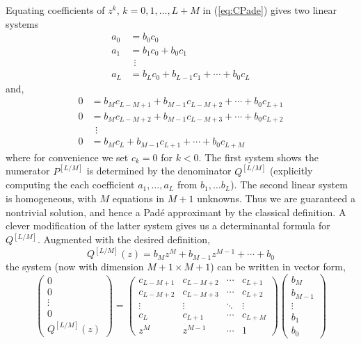 Equating coefficients of $z^k$, $k = 0, 1, \ldots, L+M$ in (\ref{eq:CPade}) gives two linear systems
\begin{align*}
  a_0 &= b_0c_0 \\
  a_1 &= b_1c_0 + b_0c_1 \\
  &~~\vdots \\
  a_L &= b_L c_0 + b_{L-1}c_1 + \cdots + b_0c_L
\end{align*}
and,
\begin{align*}
  0 &= b_{M}c_{L-M+1} + b_{M-1}c_{L-M+2} + \cdots + b_0c_{L+1} \\
  0 &= b_{M}c_{L-M+2} + b_{M-1}c_{L-M+3} + \cdots + b_0c_{L+2} \\
  &~~\vdots \\
  0 &= b_{M}c_L + b_{M-1}c_{L+1} + \cdots + b_0c_{L+M}
\end{align*}
where for convenience we set $c_k = 0$ for $k < 0$. The first system shows the numerator $P^{[L/M]}$ is determined by the denominator $Q^{[L/M]}$ (explicitly computing the each coefficient $a_1, \ldots, a_L$ from $b_1, \ldots b_L$). The second linear system is homogeneous, with $M$ equations in $M + 1$ unknowns. Thus we are guaranteed a nontrivial solution, and hence a Pad\'e approximant by the classical definition. A clever modification of the latter system gives us a determinantal formula for $Q^{[L/M]}$. Augmented with the desired definition, 
\[
  Q^{[L/M]}(z) = b_M z^M + b_{M-1}z^{M-1} + \cdots + b_0
\]
the system (now with dimension $M+1 \times M+1$) can be written in vector form,
\[
  \begin{pmatrix}
    0 \\ 0 \\ \vdots \\ 0 \\ Q^{[L/M]}(z)
  \end{pmatrix}
  =
  \begin{pmatrix}
    c_{L-M+1} & c_{L-M+2} & \cdots & c_{L+1} \\
    c_{L-M+2} & c_{L-M+3} & \cdots & c_{L+2} \\
    \vdots & \vdots & \ddots & \vdots \\
    c_{L} & c_{L+1} & \cdots & c_{L+M} \\
    z^M & z^{M-1} & \cdots & 1
  \end{pmatrix}
  \begin{pmatrix}
    b_M \\ b_{M-1} \\ \vdots \\ b_1 \\ b_0
  \end{pmatrix}
\]
